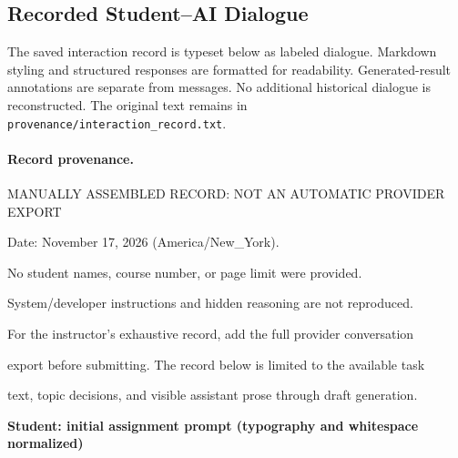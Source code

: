 
\subsection{Recorded Student--AI Dialogue}

The saved interaction record is typeset below as labeled dialogue. Markdown styling and structured responses are formatted for readability. Generated-result annotations are separate from messages. No additional historical dialogue is reconstructed. The original text remains in \texttt{provenance/interaction\_record.txt}.

\paragraph{Record provenance.}

MANUALLY ASSEMBLED RECORD: NOT AN AUTOMATIC PROVIDER EXPORT\par
Date: November 17, 2026 (America/New\_York).\par
No student names, course number, or page limit were provided.\par
System/developer instructions and hidden reasoning are not reproduced.\par
For the instructor's exhaustive record, add the full provider conversation\par
export before submitting. The record below is limited to the available task\par
text, topic decisions, and visible assistant prose through draft generation.\par

\par\medskip\noindent\textbf{Student: initial assignment prompt (typography and whitespace normalized)}\par

